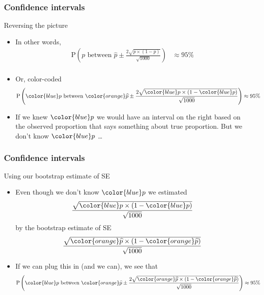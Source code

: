 \documentclass[handout]{beamer}
\begin{document}

   \begin{frame} \frametitle{Confidence intervals}

   \begin{block}
   {Reversing the picture}
   \begin{itemize}
   \item In other words,
   $$
   \begin{aligned}
   \text{P} \left(\text{$p$ between $\widehat{p} \pm \frac{2\sqrt{p \times (1-p)}}{\sqrt{1000}}$}\right) &\approx 95\% \\
   \end{aligned}
   $$
   \item Or, color-coded
   $$
   \begin{aligned}
   \text{P} \left(\text{${\color{blue} p}$ between ${\color{orange} \widehat{p}} \pm \frac{2\sqrt{{\color{blue} p} \times (1-{\color{blue} p})}}{\sqrt{1000}}$}\right) &\approx 95\% \\
   \end{aligned}
   $$
   \item If we knew ${\color{blue} p}$ we would have an interval on the right based
   on the {\color{orange} observed proportion} that says something about
   {\color{blue} true proportion}. But we don't know ${\color{blue} p}$ \dots
   \end{itemize}
   \end{block}
   \end{frame}


   \begin{frame} \frametitle{Confidence intervals}

   \begin{block}
   {Using our bootstrap estimate of SE}
   \begin{itemize}
   \item Even though we don't know ${\color{blue} p}$ we estimated
   $$
   \frac{\sqrt{{\color{blue} p} \times (1-{\color{blue} p})}}{\sqrt{1000}}
   $$
   by the bootstrap estimate of SE
   $$
   \frac{\sqrt{{\color{orange} \widehat{p}} \times (1-{\color{orange} \widehat{p}})}}{\sqrt{1000}}
   $$
   \item If we can plug this in (and we can), we see that
   $$
   \begin{aligned}
   \text{P} \left(\text{${\color{blue} p}$ between ${\color{orange} \widehat{p}} \pm \frac{2\sqrt{{\color{orange} \widehat{p}} \times (1-{\color{orange} \widehat{p}})}}{\sqrt{1000}}$}\right) &\approx 95\% \\
   \end{aligned}
   $$

   \end{itemize}
   \end{block}
   \end{frame}
\end{document}
